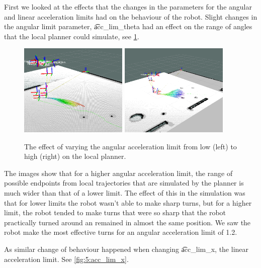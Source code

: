 First we looked at the effects that the changes in the parameters for the angular and linear acceleration limits had on the behaviour of the robot. Slight changes in the angular limit parameter, \t{acc_lim_theta} had an effect on the range of angles that the local planner could simulate, see \cref{fig:5:acc_lim_theta}.

\begin{figure}
	\centering
	\includegraphics[width=0.46\textwidth]{./img/smallangularA}
	\includegraphics[width=0.46\textwidth]{./img/highangularA}
	\caption{The effect of varying the angular acceleration limit from low (left) to high (right) on the local planner.}
	\label{fig:5:acc_lim_theta}
\end{figure}

The images show that for a higher angular acceleration limit, the range of possible endpoints from local trajectories that are simulated by the planner is much wider than that of a lower limit. The effect of this in the simulation was that for lower limits the robot wasn't able to make sharp turns, but for a higher limit, the robot tended to make turns that were so sharp that the robot practically turned around an remained in almost the same position. We saw the robot make the most effective turns for an angular acceleration limit of 1.2.

As similar change of behaviour happened when changing \t{acc_lim_x}, the linear acceleration limit. See \cref{fig:5:acc_lim_x}.

